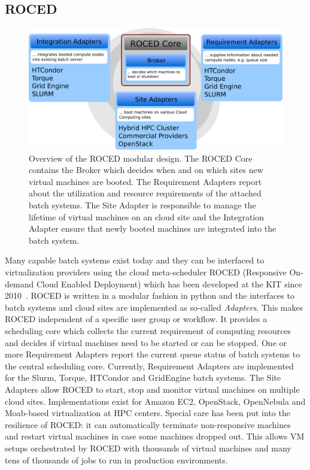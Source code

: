 \subsection{ROCED}
\begin{figure}
\begin{center}
  \includegraphics[width=0.9\linewidth]{figures/roced_design_flat.pdf}
  \caption{Overview of the ROCED modular design. The ROCED Core contains the Broker which decides when and on which sites new virtual machines are booted. The Requirement Adapters report about the utilization and resource requirements of the attached batch systems. The Site Adapter is responsible to manage the lifetime of virtual machines on an cloud site and the Integration Adapter ensure that newly booted machines are integrated into the batch system.}
  \label{fig-frplots}
\end{center}
\end{figure}

Many capable batch systems exist today and they can be interfaced to virtualization providers using the cloud meta-scheduler ROCED (Responsive On-demand Cloud Enabled Deployment) which has been developed at the KIT since 2010~\cite{ROCED}. ROCED is written in a modular
fashion in python and the interfaces to batch systems and cloud sites are implemented as so-called \textit{Adapters}. This makes ROCED independent of a specific user group or workflow. It provides a scheduling core which collects the current requirement of computing resources and decides if virtual machines need to be started or can be stopped. One or more Requirement Adapters report the current queue status of batch systems to the central scheduling core. Currently, Requirement Adapters are implemented for the Slurm, Torque, HTCondor and GridEngine batch systems. The Site Adapters allow ROCED to start, stop and monitor virtual machines on multiple cloud sites. Implementations exist for Amazon EC2, OpenStack, OpenNebula and Moab-based virtualization at HPC centers. Special care has been put into the resilience of ROCED: it can automatically terminate non-responsive machines and restart virtual machines in case some machines dropped out. This allows VM setups orchestrated by ROCED with thousands of virtual machines and many tens of thousands of jobs to run in production environments.


